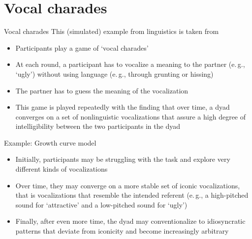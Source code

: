 \documentclass[aspectratio=169]{beamer}
\begin{document}
\section{Vocal charades}

\begin{frame}{Vocal charades \citep{Winter2016}}
This (simulated) example from linguistics is taken from \citet{Winter2016}\\[2ex]
\begin{itemize}
  \item Participants play a game of `vocal charades'
  \item At each round, a participant has to vocalize a meaning to the
  partner (e.\,g., `ugly') without using language (e.\,g., through grunting or
  hissing)
  \item The partner has to guess the meaning of the vocalization
  \item This game is played repeatedly with the finding that over time, a
  dyad converges on a set of nonlinguistic vocalizations that assure a high
  degree of intelligibility between the two participants in the dyad
\end{itemize}
\end{frame}


\begin{frame}{Example: Growth curve model}
\begin{itemize}
  \item Initially, participants may be struggling with the task and explore
  very different kinds of vocalizations
  \item Over time, they may converge on a more stable set of iconic
  vocalizations, that is vocalizations that resemble the intended referent
  (e.\,g., a high-pitched sound for `attractive' and a low-pitched sound for
  `ugly')
  \item Finally, after even more time, the dyad may conventionalize to
  idiosyncratic patterns that deviate from iconicity and become
  increasingly arbitrary
\end{itemize}
\end{frame}
\end{document}
